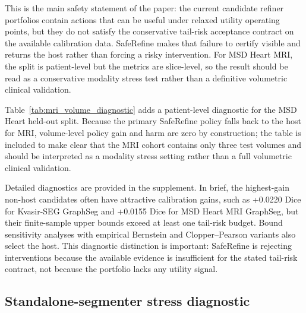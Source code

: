 \documentclass[preprint,12pt]{elsarticle}
\begin{document}
This is the main safety statement of the paper: the current candidate refiner
portfolios contain actions that can be useful under relaxed utility operating
points, but they do not satisfy the conservative tail-risk acceptance contract
on the available calibration data. SafeRefine makes that failure to certify visible
and returns the host rather than forcing a risky intervention. For MSD Heart
MRI, the split is patient-level but the metrics are slice-level, so the result
should be read as a conservative modality stress test rather than a definitive
volumetric clinical validation.



Table~\ref{tab:mri_volume_diagnostic} adds a patient-level diagnostic for the
MSD Heart held-out split. Because the primary SafeRefine policy falls back to
the host for MRI, volume-level policy gain and harm are zero by construction;
the table is included to make clear that the MRI cohort contains only three
test volumes and should be interpreted as a modality stress setting rather than
a full volumetric clinical validation.



Detailed diagnostics are provided in the supplement. In brief, the highest-gain
non-host candidates often have attractive calibration gains, such as +0.0220
Dice for Kvasir-SEG GraphSeg and +0.0155 Dice for MSD Heart MRI GraphSeg, but
their finite-sample upper bounds exceed at least one tail-risk budget. Bound
sensitivity analyses with empirical Bernstein and Clopper--Pearson variants
also select the host. This diagnostic distinction is important: SafeRefine is
rejecting interventions because the available evidence is insufficient for the
stated tail-risk contract, not because the portfolio lacks any utility signal.

\subsection{Standalone-segmenter stress diagnostic}
\end{document}
